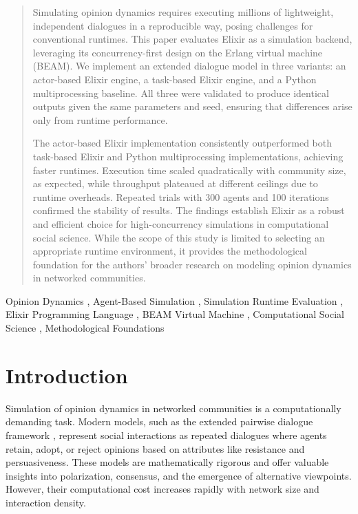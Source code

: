 \documentclass[
]{ceurart}
\begin{document}
\begin{abstract}
Simulating opinion dynamics requires executing millions of lightweight, independent dialogues in a reproducible way, posing challenges for conventional runtimes. This paper evaluates Elixir as a simulation backend, leveraging its concurrency-first design on the Erlang virtual machine (BEAM). We implement an extended dialogue model in three variants: an actor-based Elixir engine, a task-based Elixir engine, and a Python multiprocessing baseline. All three were validated to produce identical outputs given the same parameters and seed, ensuring that differences arise only from runtime performance.

The actor-based Elixir implementation consistently outperformed both task-based Elixir and Python multiprocessing implementations, achieving faster runtimes. Execution time scaled quadratically with community size, as expected, while throughput plateaued at different ceilings due to runtime overheads. Repeated trials with 300 agents and 100 iterations confirmed the stability of results. The findings establish Elixir as a robust and efficient choice for high-concurrency simulations in computational social science. While the scope of this study is limited to selecting an appropriate runtime environment, it provides the methodological foundation for the authors’ broader research on modeling opinion dynamics in networked communities.

\end{abstract}

\begin{keywords}
Opinion Dynamics \sep 
Agent-Based Simulation \sep 
Simulation Runtime Evaluation \sep 
Elixir Programming Language \sep 
BEAM Virtual Machine \sep 
Computational Social Science \sep 
Methodological Foundations
\end{keywords}

\maketitle

\section{Introduction}
Simulation of opinion dynamics in networked communities is a computationally demanding task. Modern models, such as the extended pairwise dialogue framework \cite{Lytvynenko2025}, represent social interactions as repeated dialogues where agents retain, adopt, or reject opinions based on attributes like resistance and persuasiveness. These models are mathematically rigorous and offer valuable insights into polarization, consensus, and the emergence of alternative viewpoints. However, their computational cost increases rapidly with network size and interaction density.
\end{document}
